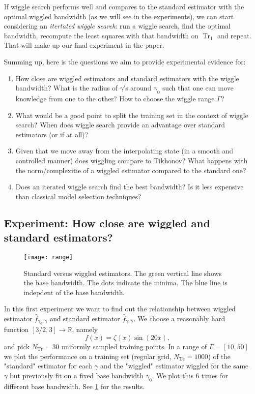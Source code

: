 \documentclass[12pt]{amsart}
\newcommand{\R}{\mathbb{R}}
\DeclareMathOperator{\Tr}{Tr}
\DeclareMathOperator{\Te}{Te}
\begin{document}
If wiggle search performs well and compares to the standard estimator 
with the optimal wiggled bandwidth (as we will see in the experiments), 
we can start considering an \emph{itertated wiggle search}:
run a wiggle search, find the optimal bandwidth, recompute the 
least squares with that bandwidth on $\Tr_1$ and repeat.
That will make up our final experiment in the paper.

Summing up, here is the questions we aim to provide experimental 
evidence for:
\begin{enumerate}
    \item How close are wiggled estimators and standard estimators with 
        the wiggle bandwidth? 
        What is the radius of $\gamma$'s around $\gamma_0$ such that one 
        can move knowledge from one to the other? 
        How to choose the wiggle range $\Gamma$?
    \item What would be a good point to split the training set in the 
        context of wiggle search?
        When does wiggle search provide an advantage over standard 
        estimators (or if at all)?
    \item Given that we move away from the interpolating state 
        (in a smooth and controlled manner) does wiggling compare to 
        Tikhonov?
        What happens with the norm/complexitie of a wiggled estimator
        compared to the standard one?
    \item Does an iterated wiggle search find the best bandwidth?
        Is it less expensive than classical model selection techniques?
\end{enumerate}

\subsection{Experiment: How close are wiggled and standard estimators?}

\begin{figure}[htp]
    \centering
    \texttt{[image: range]}
    \caption{
        Standard versus wiggled estimators. 
        The green vertical line shows the base bandwidth.
        The dots indicate the minima.
        The blue line is indepdent of the base bandwidth. }
    \label{fig:range}
\end{figure}

In this first experiment we want to find out the relationship between wiggled
estimator $\hat f_{\gamma_0,\gamma}$ and standard estimator 
$\hat f_{\gamma,\gamma}$.
We choose a reasonably hard function $[3/2, 3] \to \R$, namely
\[ f(x) = \zeta(x) \sin(20 x), \]
and pick $N_{\Tr} = 30$ uniformly sampled training points.
In a range of $\Gamma = [10,50]$ we plot the performance on 
a training set (regular grid, $N_{\Te} = 1000$) of the "standard" estimator
for each $\gamma$ and the "wiggled" estimator wiggled for the same 
$\gamma$ but previously fit on a fixed base bandwidth $\gamma_0$.
We plot this 6 times for different base bandwidth.
See \cref{fig:range} for the results.
\end{document}
